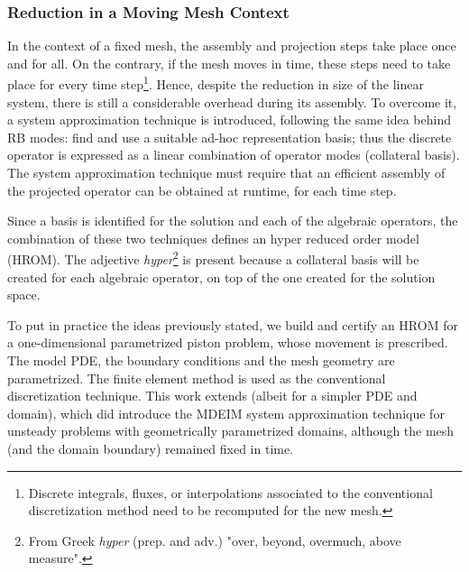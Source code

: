 \documentclass[thesis.tex]{subfiles}
\begin{document}
\subsubsection{Reduction in a Moving Mesh Context}
In the context of a fixed mesh, 
the assembly and projection steps take place once and for all.
On the contrary, if the mesh moves in time,
these steps need to take place for every time step\footnote
{
    Discrete 
    integrals,
    fluxes, 
    or interpolations 
    associated to the conventional discretization method
    need to be recomputed for the new mesh.
}.
Hence, despite the reduction in size of the linear system,
there is still a considerable overhead during its assembly.
To overcome it, a system approximation technique is introduced,
following the same idea behind RB modes: 
find and use a suitable ad-hoc representation basis;
thus the discrete operator is expressed as 
a linear combination of operator modes (collateral basis).
The system approximation technique must require that 
an efficient assembly of the projected operator can be obtained
at runtime, for each time step.

Since a basis is identified for the solution and each of the algebraic operators,
the combination of these two techniques defines an hyper reduced order model (HROM).
The adjective \mbox{\textit{hyper}}\footnote{
    From Greek \textit{hyper} (prep. and adv.) 
    "over, beyond, overmuch, above measure".
} is present because 
a collateral basis will be created for each algebraic operator,
on top of the one created for the solution space.

To put in practice the ideas previously stated, 
we build and certify an HROM 
for a one-dimensional parametrized piston problem, 
whose movement is prescribed.
The model PDE, the boundary conditions and 
the mesh geometry are parametrized.
The finite element method is used as the conventional discretization technique.
This work extends 
\cite{Santo_Manzoni_2019,
2015_efficientModelReductionParametrizedSystemsMatrixDeim_Negri}
(albeit for a simpler PDE and domain), 
which did introduce the MDEIM system approximation technique 
for unsteady problems with geometrically parametrized domains, 
although the mesh (and the domain boundary) remained fixed in time.
\end{document}
